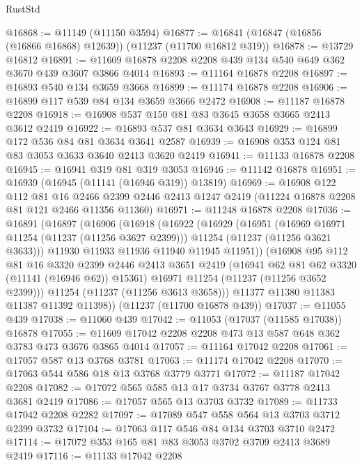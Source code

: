 \begin{lexlean}{RustStd}
\begin{coremodule}
@16868 := @11149 (@11150 @3594)
@16877 := @16841 (@16847 (@16856 (@16866 @16868) @12639)) (@11237 (@11700 @16812 @319))
@16878 := @13729 @16812
@16891 := @11609 @16878 @2208 @2208 @439 @134 @540 @649 @362 @3670 @439 @3607 @3866 @4014
@16893 := @11164 @16878 @2208
@16897 := @16893 @540 @134 @3659 @3668
@16899 := @11174 @16878 @2208
@16906 := @16899 @117 @539 @84 @134 @3659 @3666 @2472
@16908 := @11187 @16878 @2208
@16918 := @16908 @537 @150 @81 @83 @3645 @3658 @3665 @2413 @3612 @2419
@16922 := @16893 @537 @81 @3634 @3643
@16929 := @16899 @172 @536 @84 @81 @3634 @3641 @2587
@16939 := @16908 @353 @124 @81 @83 @3053 @3633 @3640 @2413 @3620 @2419
@16941 := @11133 @16878 @2208
@16945 := @16941 @319 @81 @319 @3053
@16946 := @11142 @16878
@16951 := @16939 (@16945 (@11141 (@16946 @319)) @13819)
@16969 := @16908
    @122
    @112
    @81
    @16
    @2466
    @2399
    @2446
    @2413
    @1247
    @2419
    (@11224 @16878 @2208 @81 @121 @2466 @11356 @11360)
@16971 := @11248 @16878 @2208
@17036 := @16891
    (@16897
      (@16906
        (@16918
          (@16922
            (@16929
              (@16951
                (@16969 @16971 @11254 (@11237 (@11256 @3627 @2399)))
                @11254
                (@11237 (@11256 @3621 @3633)))
              @11930
              @11933
              @11936
              @11940
              @11945
              @11951))
          (@16908
            @95
            @112
            @81
            @16
            @3320
            @2399
            @2446
            @2413
            @3651
            @2419
            (@16941 @62 @81 @62 @3320 (@11141 (@16946 @62)) @15361)
            @16971
            @11254
            (@11237 (@11256 @3652 @2399)))
          @11254
          (@11237 (@11256 @3613 @3658)))
        @11377
        @11380
        @11383
        @11387
        @11392
        @11398))
    (@11237 (@11700 @16878 @439))
@17037 := @11055 @439
@17038 := @11060 @439
@17042 := @11053 (@17037 (@11585 @17038)) @16878
@17055 := @11609 @17042 @2208 @2208 @473 @13 @587 @648 @362 @3783 @473 @3676 @3865 @4014
@17057 := @11164 @17042 @2208
@17061 := @17057 @587 @13 @3768 @3781
@17063 := @11174 @17042 @2208
@17070 := @17063 @544 @586 @18 @13 @3768 @3779 @3771
@17072 := @11187 @17042 @2208
@17082 := @17072 @565 @585 @13 @17 @3734 @3767 @3778 @2413 @3681 @2419
@17086 := @17057 @565 @13 @3703 @3732
@17089 := @11733 @17042 @2208 @2282
@17097 := @17089 @547 @558 @564 @13 @3703 @3712 @2399 @3732
@17104 := @17063 @117 @546 @84 @134 @3703 @3710 @2472
@17114 := @17072 @353 @165 @81 @83 @3053 @3702 @3709 @2413 @3689 @2419
@17116 := @11133 @17042 @2208

\end{coremodule}
\end{lexlean}
